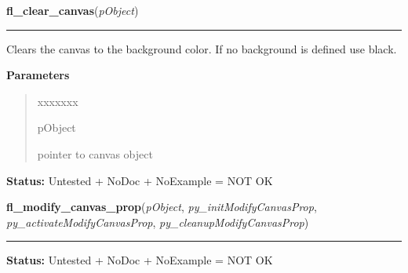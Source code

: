     \vspace{0.5ex}

\hspace{.8\funcindent}\begin{boxedminipage}{\funcwidth}

    \raggedright \textbf{fl\_clear\_canvas}(\textit{pObject})

    \vspace{-1.5ex}

    \rule{\textwidth}{0.5\fboxrule}
\setlength{\parskip}{2ex}
    Clears the canvas to the background color. If no background is defined 
    use black.

\setlength{\parskip}{1ex}
      \textbf{Parameters}
      \vspace{-1ex}

      \begin{quote}
        \begin{Ventry}{xxxxxxx}

          \item[pObject]

          pointer to canvas object

        \end{Ventry}

      \end{quote}

\textbf{Status:} Untested + NoDoc + NoExample = NOT OK



    \end{boxedminipage}

    \label{xformslib:library:fl_modify_canvas_prop}

    \vspace{0.5ex}

\hspace{.8\funcindent}\begin{boxedminipage}{\funcwidth}

    \raggedright \textbf{fl\_modify\_canvas\_prop}(\textit{pObject}, \textit{py\_initModifyCanvasProp}, \textit{py\_activateModifyCanvasProp}, \textit{py\_cleanupModifyCanvasProp})

    \vspace{-1.5ex}

    \rule{\textwidth}{0.5\fboxrule}
\setlength{\parskip}{2ex}
\setlength{\parskip}{1ex}
\textbf{Status:} Untested + NoDoc + NoExample = NOT OK



    \end{boxedminipage}

